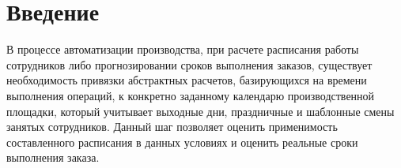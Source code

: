 \section*{Введение}
В процессе автоматизации производства, при расчете расписания работы сотрудников либо прогнозировании сроков выполнения заказов, существует необходимость привязки абстрактных расчетов, базирующихся на времени выполнения операций, к конкретно заданному календарю производственной площадки, который учитывает выходные дни, праздничные и шаблонные смены занятых сотрудников. Данный шаг позволяет оценить применимость составленного расписания в данных условиях и оценить реальные сроки выполнения заказа.
\newpage